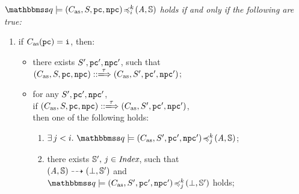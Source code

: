 \begin{definition}
    \em
    \label{def:sim-imp-prim-state}
    $\simFunctionSt{\relastQ}{(\asmimp, \state, \pc, \npc)}{i}{k}{(\primcom, \hpstate)}$
    holds if and only if the following are true: 
    \small
    \begin{enumerate}[1.]
        \item if $C_{\text{as}}(\texttt{pc}) = \texttt{i}$, then: 
            \begin{itemize}
                \item there exists $S', \texttt{pc}', \texttt{npc}'$, 
                    such that \\
                    $\LGlobTrans{(\asmimp, \state, \pc, \npc)}{\empmsg\,}
                        {(\asmimp, \state', \pc', \npc')}$; 
                \item for any $S', \texttt{pc}', \texttt{npc}'$, \\ 
                    if 
                    $\LGlobTrans{(\asmimp, \state, \pc, \npc)}{\empmsg\,}
                        {(\asmimp, \state', \pc', \npc')}$, \\ then one of 
                        the following holds: 
                    \begin{enumerate}
                        \item $\exists \, j < i. \ 
                            \simFunctionSt{\relastQ}{(\asmimp, \state', \pc', \npc')}
                                {j}{k}{(\primcom, \hpstate)}$; 
                        \item there exists $\mathbb{S}', \, j \in \textit{Index}$, 
                            such that \\
                            ${(\textit{A}, \mathbb{S})} \dashrightarrow {(\perp, \mathbb{S}')}$ 
                            and \\
                            $\simFunctionSt{\relastQ}{(\asmimp, \state', \pc', \npc')}
                                {j}{k}{(\primdone, \hpstate')}$ holds; 
                    \end{enumerate}
            \end{itemize}
            \vspace{0.5em}
        

\end{enumerate}
\end{definition}
